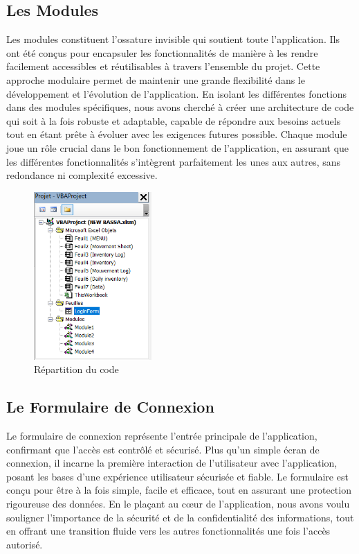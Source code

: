 \documentclass[a4paper, oneside, 12pt, final]{extreport}
\begin{document}
\subsection{Les Modules}
Les modules constituent l'ossature invisible qui soutient toute l'application. Ils ont été conçus pour encapsuler les fonctionnalités de manière à les rendre facilement accessibles et réutilisables à travers l'ensemble du projet. Cette approche modulaire permet de maintenir une grande flexibilité dans le développement et l'évolution de l'application. En isolant les différentes fonctions dans des modules spécifiques, nous avons cherché à créer une architecture de code qui soit à la fois robuste et adaptable, capable de répondre aux besoins actuels tout en étant prête à évoluer avec les exigences futures possible. Chaque module joue un rôle crucial dans le bon fonctionnement de l'application, en assurant que les différentes fonctionnalités s'intègrent parfaitement les unes aux autres, sans redondance ni complexité excessive.

\begin{figure}[h]
    \centering
    \includegraphics[width=0.4\textwidth]{Logic.png} %
    \caption{Répartition du code}
    \label{fig:Répartition du code}
\end{figure}

\subsection{Le Formulaire de Connexion}
Le formulaire de connexion représente l'entrée principale de l'application, confirmant que l'accès est contrôlé et sécurisé. Plus qu'un simple écran de connexion, il incarne la première interaction de l'utilisateur avec l'application, posant les bases d'une expérience utilisateur sécurisée et fiable. Le formulaire est conçu pour être à la fois simple, facile et efficace, tout en assurant une protection rigoureuse des données. En le plaçant au cœur de l'application, nous avons voulu souligner l'importance de la sécurité et de la confidentialité des informations, tout en offrant une transition fluide vers les autres fonctionnalités une fois l'accès autorisé.
\end{document}

